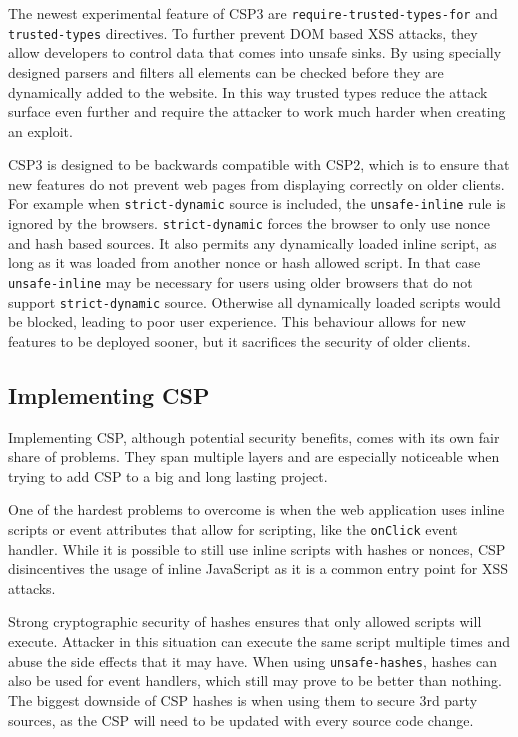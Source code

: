 The newest experimental feature of CSP3 are \texttt{require-trusted-types-for} and \\ \texttt{trusted-types} directives. \cite{TTwebdev} \cite{TTmozdev}
To further prevent DOM based XSS attacks, they allow developers to control data that comes into unsafe sinks.
By using specially designed parsers and filters all elements can be checked before they are dynamically added to the website.
In this way trusted types reduce the attack surface even further and require the attacker to work much harder when creating an exploit.

CSP3 is designed to be backwards compatible with CSP2, which is to ensure that new features do not prevent web pages from displaying correctly on older clients.
For example when \texttt{strict-dynamic} source is included, the \texttt{unsafe-inline} rule is ignored by the browsers.
\texttt{strict-dynamic} forces the browser to only use nonce and hash based sources. 
It also permits any dynamically loaded inline script, as long as it was loaded from another nonce or hash allowed script.
In that case \texttt{unsafe-inline} may be necessary for users using older browsers that do not support \texttt{strict-dynamic} source.
Otherwise all dynamically loaded scripts would be blocked, leading to poor user experience.
This behaviour allows for new features to be deployed sooner, but it sacrifices the security of older clients.


\subsection{Implementing CSP}
Implementing CSP, although potential security benefits, comes with its own fair share of problems. 
They span multiple layers and are especially noticeable when trying to add CSP to a big and long lasting project.

One of the hardest problems to overcome is when the web application uses inline scripts or event attributes that allow for scripting, like the \texttt{onClick} event handler.
While it is possible to still use inline scripts with hashes or nonces, CSP disincentives the usage of inline JavaScript as it is a common entry point for XSS attacks. 

Strong cryptographic security of hashes ensures that only allowed scripts will execute. 
Attacker in this situation can execute the same script multiple times and abuse the side effects that it may have.
When using \texttt{unsafe-hashes}, hashes can also be used for event handlers, which still may prove to be better than nothing.
The biggest downside of CSP hashes is when using them to secure 3rd party sources, as the CSP will need to be updated with every source code change.

